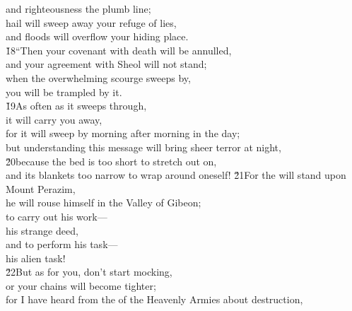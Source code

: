 \begin{poetry}
\poemll    and righteousness the plumb line; \\
\poeml hail will sweep away your refuge of lies, \\
\poemll    and floods will overflow your hiding place. \\
\poeml \v{18}``Then your covenant with death will be annulled, \\
\poemll    and your agreement with Sheol will not stand; \\
\poeml when the overwhelming scourge sweeps by, \\
\poemll    you will be trampled by it. \\
\poeml \v{19}As often as it sweeps through, \\
\poemll    it will carry you away, \\
\poeml for it will sweep by morning after morning in the day; \\
\poemll    but understanding this message will bring sheer terror at night, \\
\poeml \v{20}because the bed is too short to stretch out on, \\
\poemll    and its blankets too narrow to wrap around oneself!
\poeml \v{21}For the  will stand upon Mount Perazim, \\
\poemll    he will rouse himself in the Valley of Gibeon; \\
\poeml to carry out his work--- \\
\poemll    his strange deed, \\
\poeml and to perform his task--- \\
\poemll    his alien task! \\
\poeml \v{22}But as for you, don't start mocking, \\
\poemll    or your chains will become tighter; \\
\poeml for I have heard from the  of the Heavenly Armies about destruction, \\

\end{poetry}

